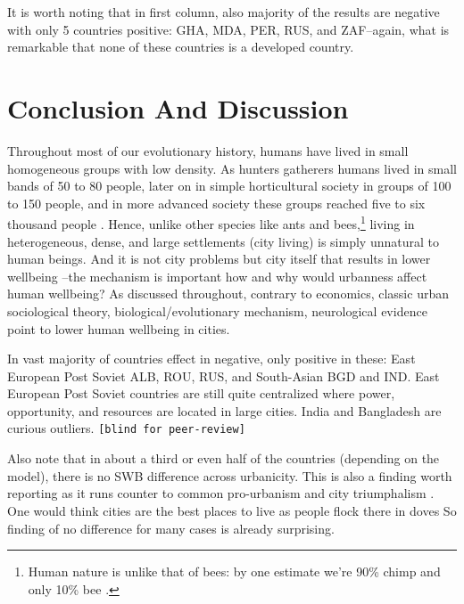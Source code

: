 \documentclass[10pt, letterpaper]{article}
\begin{document}
It is worth noting that in first column, also majority of the results are
negative with only 5 countries positive: GHA, MDA, PER, RUS, and ZAF--again,
what is remarkable that none of these countries is a developed country.


\section{Conclusion And Discussion}


Throughout most of our evolutionary history, humans have lived in small homogeneous groups with low density. As hunters gatherers humans lived in small bands of 50 to 80 people, later on in simple horticultural society in groups of 100 to 150 people, and in more advanced society these groups reached five to six thousand people \citep{maryanski92}. Hence, unlike other species like ants and bees,\footnote{Human nature is unlike that of bees: by one estimate we're 90\% chimp and only 10\% bee  \citep{haidt12B}.} living in heterogeneous, dense, and large settlements (city living) is simply unnatural to human beings.  
%
And it is not city problems but city itself that results in lower wellbeing
\citep{aok_brfss_city_cize16}--the mechanism is important how and why would
urbanness affect human wellbeing? As discussed throughout, contrary to economics, classic urban
sociological theory, biological/evolutionary mechanism, neurological evidence
point to lower human wellbeing in cities.

In vast majority of countries effect in negative, only positive in these:
East European Post Soviet ALB, ROU, RUS, and South-Asian BGD and IND.
East European Post Soviet countries are still quite centralized where power, opportunity, and resources are located in
large cities. %
India and Bangladesh are curious outliers. \texttt{[blind for
  peer-review]} %
%

Also note that in about a third or even half of the countries (depending on the
model), there is no SWB difference across urbanicity. This is also a finding
worth reporting as it runs counter to common pro-urbanism and city triumphalism
\citep[e.g.,][]{glaeser11}.
%
One would think cities are the best places to live as people flock there in doves
So finding of no difference for many cases is already surprising.
\end{document}
